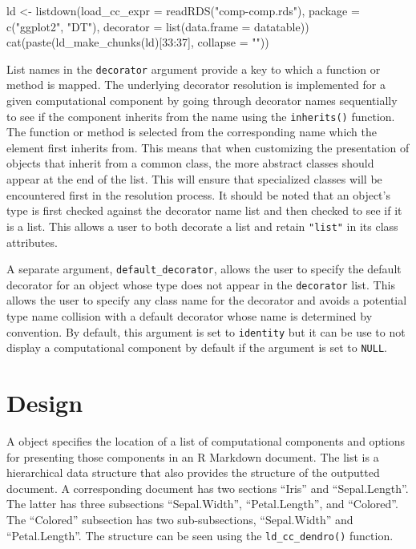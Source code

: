 \begin{Schunk}
\begin{Sinput}
ld <- listdown(load_cc_expr = readRDS("comp-comp.rds"), 
               package = c("ggplot2", "DT"),
               decorator = list(data.frame = datatable))
cat(paste(ld_make_chunks(ld)[33:37], collapse = "\n"))
\end{Sinput}
\end{Schunk}

List names in the \texttt{decorator} argument provide a key to which a
function or method is mapped. The underlying decorator resolution is
implemented for a given computational component by going through
decorator names sequentially to see if the component inherits from the
name using the \texttt{inherits()} function. The function or method is
selected from the corresponding name which the element first inherits
from. This means that when customizing the presentation of objects that
inherit from a common class, the more abstract classes should appear at
the end of the list. This will ensure that specialized classes will be
encountered first in the resolution process. It should be noted that an
object's type is first checked against the decorator name list and then
checked to see if it is a list. This allows a user to both decorate a
list and retain \texttt{"list"} in its class attributes.

A separate argument, \texttt{default\_decorator}, allows the user to
specify the default decorator for an object whose type does not appear
in the \texttt{decorator} list. This allows the user to specify any
class name for the decorator and avoids a potential type name collision
with a default decorator whose name is determined by convention. By
default, this argument is set to \texttt{identity} but it can be use to
not display a computational component by default if the argument is set
to \texttt{NULL}.

\hypertarget{design}{%
\section{Design}\label{design}}

A  object specifies the location of a list of
computational components and options for presenting those components in
an R Markdown document. The list is a hierarchical data structure that
also provides the structure of the outputted document. A corresponding
document has two sections ``Iris'' and ``Sepal.Length''. The latter has
three subsections ``Sepal.Width'', ``Petal.Length'', and ``Colored''.
The ``Colored'' subsection has two sub-subsections, ``Sepal.Width'' and
``Petal.Length''. The structure can be seen using the
\texttt{ld\_cc\_dendro()} function.

